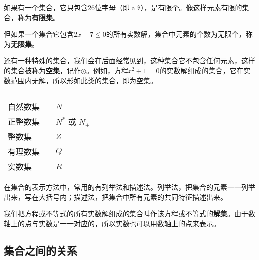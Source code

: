 \documentclass[a5paper]{article}
\begin{document}
如果有一个集合，它只包含26位字母（即 a \~ z），是有限个。像这样元素有限的集合，称为\textbf{有限集}。

但如果一个集合它包含$2x-7 \le 0$的所有实数解，集合中元素的个数为无限个，称为\textbf{无限集}。

还有一种特殊的集合，我们会在后面经常见到，这种集合它不包含任何元素，这样的集合被称为\textbf{空集}，记作$\oslash$。例如，方程$x^2 +1=0$的实数解组成的集合，它在实数范围内无解，所以形如此类的集合，即为空集。

\begin{table}[hb]
	\centering
	\begin{tabular}{|ll|l|}
        \toprule
		自然数集 & & $N$ \\
	    正整数集 & & $N^*$ 或 $N_+$ \\
		整数集 & & $Z$ \\
		有理数集 & & $Q$ \\
		实数集 & & $R$ \\ \bottomrule
	\end{tabular} \caption*{}
\end{table}

在集合的表示方法中，常用的有列举法和描述法。列举法，把集合的元素一一列举出来，写在大括号内；描述法，把集合中所有元素的共同特征描述出来。

我们把方程或不等式的所有实数解组成的集合叫作该方程或不等式的\textbf{解集}。由于数轴上的点与实数是一一对应的，所以实数也可以用数轴上的点来表示。

\subsection{集合之间的关系}
\end{document}
